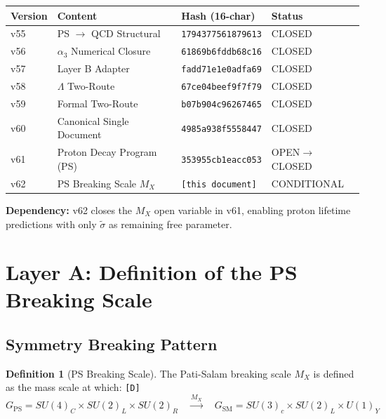 \documentclass[11pt,a4paper]{article}
\newcommand{\tagD}{\textcolor{green!50!black}{\texttt{[D]}}}
\theoremstyle{definition}
\newtheorem{definition}{Definition}[section]
\begin{document}
\begin{center}
\begin{tabular}{llll}
\toprule
Version & Content & Hash (16-char) & Status \\
\midrule
v55 & PS $\to$ QCD Structural & \texttt{1794377561879613} & CLOSED \\
v56 & $\alpha_3$ Numerical Closure & \texttt{61869b6fddb68c16} & CLOSED \\
v57 & Layer B Adapter & \texttt{fadd71e1e0adfa69} & CLOSED \\
v58 & $\Lambda$ Two-Route & \texttt{67ce04beef9f7f79} & CLOSED \\
v59 & Formal Two-Route & \texttt{b07b904c96267465} & CLOSED \\
v60 & Canonical Single Document & \texttt{4985a938f5558447} & CLOSED \\
v61 & Proton Decay Program (PS) & \texttt{353955cb1eacc053} & OPEN$\to$CLOSED \\
v62 & PS Breaking Scale $M_X$ & \texttt{[this document]} & CONDITIONAL \\
\bottomrule
\end{tabular}
\end{center}

\textbf{Dependency:} v62 closes the $M_X$ open variable in v61, enabling proton
lifetime predictions with only $\tilde{\sigma}$ as remaining free parameter.

\section{Layer A: Definition of the PS Breaking Scale}
\label{sec:mx-definition}

\subsection{Symmetry Breaking Pattern}
\label{subsec:breaking-pattern}

\begin{definition}[PS Breaking Scale]
\label{def:mx-scale}
The Pati-Salam breaking scale $M_X$ is defined as the mass scale at which: \tagD{}
\begin{equation}
\label{eq:ps-breaking-chain}
G_{\text{PS}} = SU(4)_C \times SU(2)_L \times SU(2)_R
\quad\xrightarrow{M_X}\quad
G_{\text{SM}} = SU(3)_c \times SU(2)_L \times U(1)_Y
\end{equation}
\end{definition}
\end{document}
